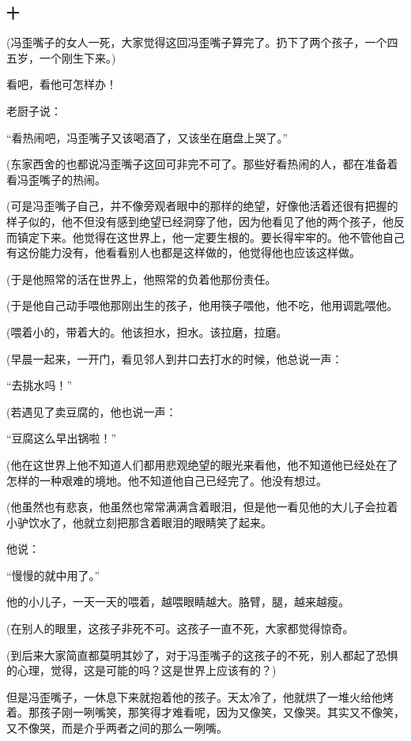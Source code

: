 \subsubsection*{十}
\par (冯歪嘴子的女人一死，大家觉得这回冯歪嘴子算完了。扔下了两个孩子，一个四五岁，一个刚生下来。)
\par 看吧，看他可怎样办！
\par 老厨子说：
\par “看热闹吧，冯歪嘴子又该喝酒了，又该坐在磨盘上哭了。”
\par (东家西舍的也都说冯歪嘴子这回可非完不可了。那些好看热闹的人，都在准备着看冯歪嘴子的热闹。
\par (可是冯歪嘴子自己，并不像旁观者眼中的那样的绝望，好像他活着还很有把握的样子似的，他不但没有感到绝望已经洞穿了他，因为他看见了他的两个孩子，他反而镇定下来。他觉得在这世界上，他一定要生根的。要长得牢牢的。他不管他自己有这份能力没有，他看看别人也都是这样做的，他觉得他也应该这样做。
\par (于是他照常的活在世界上，他照常的负着他那份责任。
\par (于是他自己动手喂他那刚出生的孩子，他用筷子喂他，他不吃，他用调匙喂他。
\par (喂着小的，带着大的。他该担水，担水。该拉磨，拉磨。
\par (早晨一起来，一开门，看见邻人到井口去打水的时候，他总说一声：
\par “去挑水吗！”
\par (若遇见了卖豆腐的，他也说一声：
\par “豆腐这么早出锅啦！”
\par (他在这世界上他不知道人们都用悲观绝望的眼光来看他，他不知道他已经处在了怎样的一种艰难的境地。他不知道他自己已经完了。他没有想过。
\par (他虽然也有悲哀，他虽然也常常满满含着眼泪，但是他一看见他的大儿子会拉着小驴饮水了，他就立刻把那含着眼泪的眼睛笑了起来。
\par 他说：
\par “慢慢的就中用了。”
\par 他的小儿子，一天一天的喂着，越喂眼睛越大。胳臂，腿，越来越瘦。
\par (在别人的眼里，这孩子非死不可。这孩子一直不死，大家都觉得惊奇。
\par (到后来大家简直都莫明其妙了，对于冯歪嘴子的这孩子的不死，别人都起了恐惧的心理，觉得，这是可能的吗？这是世界上应该有的？)
\par 但是冯歪嘴子，一休息下来就抱着他的孩子。天太冷了，他就烘了一堆火给他烤着。那孩子刚一咧嘴笑，那笑得才难看呢，因为又像笑，又像哭。其实又不像笑，又不像哭，而是介乎两者之间的那么一咧嘴。
